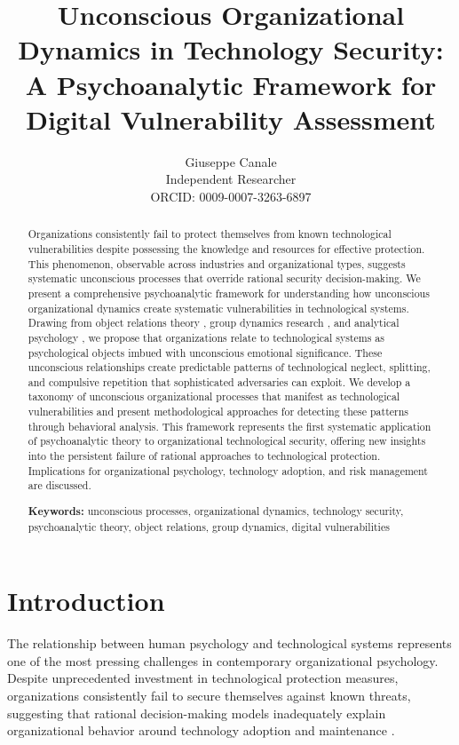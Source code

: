 \documentclass[10pt, twocolumn]{article}
\title{Unconscious Organizational Dynamics in Technology Security: A Psychoanalytic Framework for Digital Vulnerability Assessment}
\author{
Giuseppe Canale\\
Independent Researcher\\
ORCID: 0009-0007-3263-6897
}
\date{}
\begin{document}
\maketitle

\begin{abstract}
Organizations consistently fail to protect themselves from known technological vulnerabilities despite possessing the knowledge and resources for effective protection. This phenomenon, observable across industries and organizational types, suggests systematic unconscious processes that override rational security decision-making. We present a comprehensive psychoanalytic framework for understanding how unconscious organizational dynamics create systematic vulnerabilities in technological systems. Drawing from object relations theory \cite{klein1946}, group dynamics research \cite{bion1961}, and analytical psychology \cite{jung1969}, we propose that organizations relate to technological systems as psychological objects imbued with unconscious emotional significance. These unconscious relationships create predictable patterns of technological neglect, splitting, and compulsive repetition that sophisticated adversaries can exploit. We develop a taxonomy of unconscious organizational processes that manifest as technological vulnerabilities and present methodological approaches for detecting these patterns through behavioral analysis. This framework represents the first systematic application of psychoanalytic theory to organizational technological security, offering new insights into the persistent failure of rational approaches to technological protection. Implications for organizational psychology, technology adoption, and risk management are discussed.

\textbf{Keywords:} unconscious processes, organizational dynamics, technology security, psychoanalytic theory, object relations, group dynamics, digital vulnerabilities
\end{abstract}

\section{Introduction}

The relationship between human psychology and technological systems represents one of the most pressing challenges in contemporary organizational psychology. Despite unprecedented investment in technological protection measures, organizations consistently fail to secure themselves against known threats, suggesting that rational decision-making models inadequately explain organizational behavior around technology adoption and maintenance \cite{kahneman2011, ariely2008}.
\end{document}

